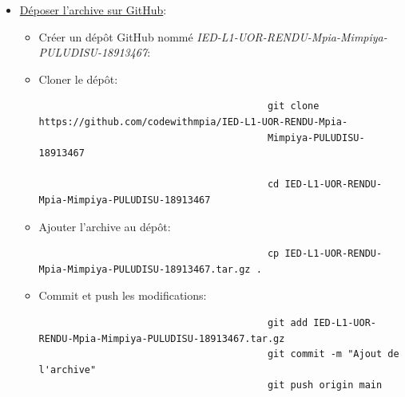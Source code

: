 \documentclass[a4paper,11pt]{article}
\begin{document}
\begin{enumerate}
\begin{itemize}
\begin{itemize}
                            \end{itemize}
                        \item  \underline{Déposer l'archive sur GitHub}: 

                        \begin{itemize}
                            \item Créer un dépôt GitHub nommé \textit{IED-L1-UOR-RENDU-Mpia-Mimpiya-PULUDISU-18913467}:
                            \item Cloner le dépôt:
                                \begin{tcolorbox}[colback=lightgray!6, colframe=black, left=-75mm, right=5mm, top=2mm, bottom=0mm, boxrule=0.1mm]
                                    \begin{verbatim}
                                        git clone https://github.com/codewithmpia/IED-L1-UOR-RENDU-Mpia-
                                        Mimpiya-PULUDISU-18913467

                                        cd IED-L1-UOR-RENDU-Mpia-Mimpiya-PULUDISU-18913467
                                    \end{verbatim}
                                \end{tcolorbox}
                            \item  Ajouter l'archive au dépôt: 
                                \begin{tcolorbox}[colback=lightgray!6, colframe=black, left=-75mm, right=5mm, top=2mm, bottom=0mm, boxrule=0.1mm]
                                    \begin{verbatim}
                                        cp IED-L1-UOR-RENDU-Mpia-Mimpiya-PULUDISU-18913467.tar.gz .
                                    \end{verbatim}
                                \end{tcolorbox}
                            \item Commit et push les modifications:
                                \begin{tcolorbox}[colback=lightgray!6, colframe=black, left=-75mm, right=5mm, top=2mm, bottom=0mm, boxrule=0.1mm]
                                    \begin{verbatim}
                                        git add IED-L1-UOR-RENDU-Mpia-Mimpiya-PULUDISU-18913467.tar.gz
                                        git commit -m "Ajout de l'archive"
                                        git push origin main
                                    \end{verbatim}
                                \end{tcolorbox}
                           

\end{itemize}
\end{itemize}
\end{enumerate}
\end{document}
